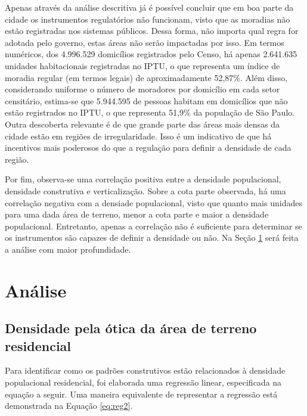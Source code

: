 Apenas através da análise descritiva já é possível concluir que em boa parte da cidade os instrumentos regulatórios não funcionam, visto que as moradias não estão registradas nos sistemas públicos. Dessa forma, não importa qual regra for adotada pelo governo, estas áreas não serão impactadas por isso. Em termos numéricos, dos 4.996.529 domicílios registrados pelo Censo, há apenas 2.641.635 unidades habitacionais registradas no IPTU, o que representa um índice de moradia regular (em termos legais) de aproximadamente 52,87\%. Além disso, considerando uniforme o número de moradores por domicílio em cada setor censitário, estima-se que 5.944.595 de pessoas habitam em domicílios que não estão registrados no IPTU, o que representa 51,9\% da população de São Paulo. Outra descoberta relevante é de que grande parte das áreas mais densas da cidade estão em regiões de irregularidade. Isso é um indicativo de que há incentivos mais poderosos do que a regulação para definir a densidade de cada região.

Por fim, observa-se uma correlação positiva entre a densidade populacional, densidade construtiva e verticalização. Sobre a cota parte observada, há uma correlação negativa com a densiade populacional, visto que quanto mais unidades para uma dada área de terreno, menor a cota parte e maior a densidade populacional. Entretanto, apenas a correlação não é suficiente para determinar se os instrumentos são capazes de definir a densidade ou não. Na Seção \ref{sec:analise} será feita a análise com maior profundidade.


\chapter{Análise}
\label{sec:analise}


\section{Densidade pela ótica da área de terreno residencial}
\label{sec:analiseR}

Para identificar como os padrões construtivos estão relacionados à densidade populacional residencial, foi elaborada uma regressão linear, especificada na equação a seguir. Uma maneira equivalente de representar a regressão está demonstrada na Equação \ref{eq:reg2}.


